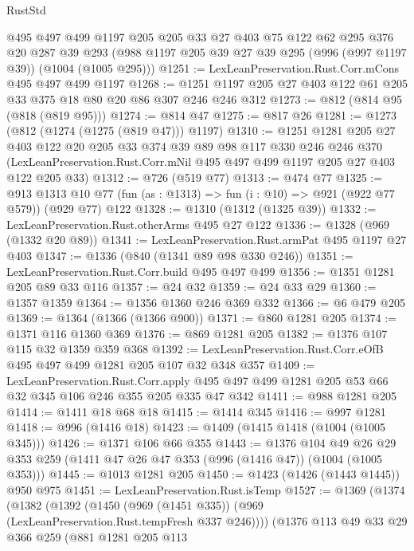 \begin{lexlean}{RustStd}
\begin{coremodule}
    @495
    @497
    @499
    @1197
    @205
    @205
    @33
    @27
    @403
    @75
    @122
    @62
    @295
    @376
    @20
    @287
    @39
    @293
    (@988 @1197 @205 @39 @27 @39 @295 (@996 (@997 @1197 @39)) (@1004 (@1005 @295)))
@1251 := LexLeanPreservation.Rust.Corr.mCons @495 @497 @499 @1197
@1268 := @1251 @1197 @205 @27 @403 @122 @61 @205 @33 @375 @18 @80 @20 @86 @307 @246 @246 @312
@1273 := @812 (@814 @95 (@818 (@819 @95)))
@1274 := @814 @47
@1275 := @817 @26
@1281 := @1273 (@812 (@1274 (@1275 (@819 @47))) @1197)
@1310 := @1251
    @1281
    @205
    @27
    @403
    @122
    @20
    @205
    @33
    @374
    @39
    @89
    @98
    @117
    @330
    @246
    @246
    @370
    (LexLeanPreservation.Rust.Corr.mNil @495 @497 @499 @1197 @205 @27 @403 @122 @205 @33)
@1312 := @726 (@519 @77)
@1313 := @474 @77
@1325 := @913
    @1313
    @10
    @77
    (fun (as : @1313) => fun (i : @10) => @921 (@922 @77 @579))
    (@929 @77)
    @122
@1328 := @1310 (@1312 (@1325 @39))
@1332 := LexLeanPreservation.Rust.otherArms @495 @27 @122
@1336 := @1328 (@969 (@1332 @20 @89))
@1341 := LexLeanPreservation.Rust.armPat @495 @1197 @27 @403
@1347 := @1336 (@840 (@1341 @89 @98 @330 @246))
@1351 := LexLeanPreservation.Rust.Corr.build @495 @497 @499
@1356 := @1351 @1281 @205 @89 @33 @116
@1357 := @24 @32
@1359 := @24 @33 @29
@1360 := @1357 @1359
@1364 := @1356 @1360 @246 @369 @332
@1366 := @6 @479 @205
@1369 := @1364 (@1366 (@1366 @900))
@1371 := @860 @1281 @205
@1374 := @1371 @116 @1360 @369
@1376 := @869 @1281 @205
@1382 := @1376 @107 @115 @32 @1359 @359 @368
@1392 := LexLeanPreservation.Rust.Corr.eOfB @495 @497 @499 @1281 @205 @107 @32 @348 @357
@1409 := LexLeanPreservation.Rust.Corr.apply
    @495
    @497
    @499
    @1281
    @205
    @53
    @66
    @32
    @345
    @106
    @246
    @355
    @205
    @335
    @47
    @342
@1411 := @988 @1281 @205
@1414 := @1411 @18 @68 @18
@1415 := @1414 @345
@1416 := @997 @1281
@1418 := @996 (@1416 @18)
@1423 := @1409 (@1415 @1418 (@1004 (@1005 @345)))
@1426 := @1371 @106 @66 @355
@1443 := @1376
    @104
    @49
    @26
    @29
    @353
    @259
    (@1411 @47 @26 @47 @353 (@996 (@1416 @47)) (@1004 (@1005 @353)))
@1445 := @1013 @1281 @205
@1450 := @1423 (@1426 (@1443 @1445)) @950 @975
@1451 := LexLeanPreservation.Rust.isTemp
@1527 := @1369
    (@1374
      (@1382
        (@1392 (@1450 (@969 (@1451 @335)) (@969 (LexLeanPreservation.Rust.tempFresh @337 @246))))
        (@1376
          @113
          @49
          @33
          @29
          @366
          @259
          (@881
            @1281
            @205
            @113

\end{coremodule}
\end{lexlean}
